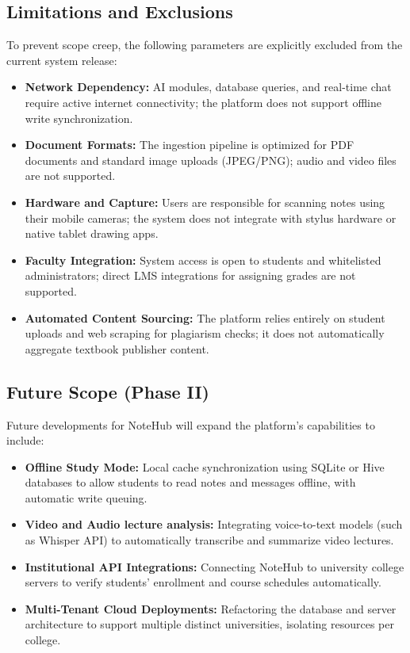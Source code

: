 \documentclass[12,Times new Roman,a4paper]{report}
\begin{document}
\subsection{Limitations and Exclusions}
To prevent scope creep, the following parameters are explicitly excluded from the current system release:
\begin{itemize}
    \item \textbf{Network Dependency:} AI modules, database queries, and real-time chat require active internet connectivity; the platform does not support offline write synchronization.
    \item \textbf{Document Formats:} The ingestion pipeline is optimized for PDF documents and standard image uploads (JPEG/PNG); audio and video files are not supported.
    \item \textbf{Hardware and Capture:} Users are responsible for scanning notes using their mobile cameras; the system does not integrate with stylus hardware or native tablet drawing apps.
    \item \textbf{Faculty Integration:} System access is open to students and whitelisted administrators; direct LMS integrations for assigning grades are not supported.
    \item \textbf{Automated Content Sourcing:} The platform relies entirely on student uploads and web scraping for plagiarism checks; it does not automatically aggregate textbook publisher content.
\end{itemize}

\subsection{Future Scope (Phase II)}
Future developments for NoteHub will expand the platform's capabilities to include:
\begin{itemize}
    \item \textbf{Offline Study Mode:} Local cache synchronization using SQLite or Hive databases to allow students to read notes and messages offline, with automatic write queuing.
    \item \textbf{Video and Audio lecture analysis:} Integrating voice-to-text models (such as Whisper API) to automatically transcribe and summarize video lectures.
    \item \textbf{Institutional API Integrations:} Connecting NoteHub to university college servers to verify students' enrollment and course schedules automatically.
    \item \textbf{Multi-Tenant Cloud Deployments:} Refactoring the database and server architecture to support multiple distinct universities, isolating resources per college.
\end{itemize}
\end{document}
